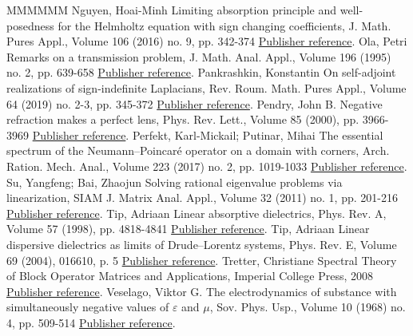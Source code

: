 \documentclass[11pt]{article}
\theoremstyle{definition}
\numberwithin{equation}{section}
\numberwithin{figure}{section}
\numberwithin{table}{section}
\begin{document}
\begin{thebibliography}{MMMMMM}
 Nguyen, Hoai-Minh Limiting absorption principle and well-posedness for the Helmholtz equation with sign changing coefficients, J. Math. Pures Appl., Volume 106 (2016) no. 9, pp. 342-374 \href{https://ahl.centre-mersenne.org/item/AHL_2020__3__1161_0/#Ngu-16}{Publisher reference}.
 Ola, Petri Remarks on a transmission problem, J. Math. Anal. Appl., Volume 196 (1995) no. 2, pp. 639-658 \href{https://ahl.centre-mersenne.org/item/AHL_2020__3__1161_0/#Ola-95}{Publisher reference}.
 Pankrashkin, Konstantin On self-adjoint realizations of sign-indefinite Laplacians, Rev. Roum. Math. Pures Appl., Volume 64 (2019) no. 2-3, pp. 345-372 \href{https://ahl.centre-mersenne.org/item/AHL_2020__3__1161_0/#Pan}{Publisher reference}.
 Pendry, John B. Negative refraction makes a perfect lens, Phys. Rev. Lett., Volume 85 (2000), pp. 3966-3969 \href{https://ahl.centre-mersenne.org/item/AHL_2020__3__1161_0/#Pen-00}{Publisher reference}.
 Perfekt, Karl-Mickail; Putinar, Mihai The essential spectrum of the Neumann–Poincaré operator on a domain with corners, Arch. Ration. Mech. Anal., Volume 223 (2017) no. 2, pp. 1019-1033 \href{https://ahl.centre-mersenne.org/item/AHL_2020__3__1161_0/#Per-Put-17}{Publisher reference}.
 Su, Yangfeng; Bai, Zhaojun Solving rational eigenvalue problems via linearization, SIAM J. Matrix Anal. Appl., Volume 32 (2011) no. 1, pp. 201-216 \href{https://ahl.centre-mersenne.org/item/AHL_2020__3__1161_0/#Su-Bai-11}{Publisher reference}.
 Tip, Adriaan Linear absorptive dielectrics, Phys. Rev. A, Volume 57 (1998), pp. 4818-4841 \href{https://ahl.centre-mersenne.org/item/AHL_2020__3__1161_0/#Tip-98}{Publisher reference}.
 Tip, Adriaan Linear dispersive dielectrics as limits of Drude–Lorentz systems, Phys. Rev. E, Volume 69 (2004), 016610, p. 5 \href{https://ahl.centre-mersenne.org/item/AHL_2020__3__1161_0/#Tip-04}{Publisher reference}.
 Tretter, Christiane Spectral Theory of Block Operator Matrices and Applications, Imperial College Press, 2008 \href{https://ahl.centre-mersenne.org/item/AHL_2020__3__1161_0/#Tre-08}{Publisher reference}.
 Veselago, Viktor G. The electrodynamics of substance with simultaneously negative values of \(\varepsilon\) and \(\mu\), Sov. Phys. Usp., Volume 10 (1968) no. 4, pp. 509-514 \href{https://ahl.centre-mersenne.org/item/AHL_2020__3__1161_0/#Ves-68}{Publisher reference}.
\end{thebibliography}
\end{document}
